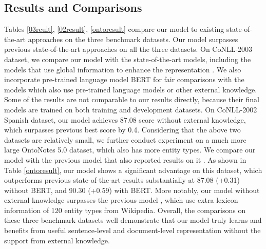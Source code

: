 \documentclass[letterpaper]{article} \usepackage{aaai20}  \usepackage{times}  \usepackage{helvet} \usepackage{courier}  \usepackage[hyphens]{url}  \usepackage{graphicx} \urlstyle{rm} \def\UrlFont{\rm}  \usepackage{graphicx}  \frenchspacing  \setlength{\pdfpagewidth}{8.5in}  \setlength{\pdfpageheight}{11in}
\begin{document}
\subsection{Results and Comparisons} 
Tables \ref{03reult}, \ref{02result}, \ref{ontoresult} compare our model to existing state-of-the-art approaches on the three benchmark datasets. Our model surpasses previous state-of-the-art approaches on all the three datasets.
On CoNLL-2003 dataset, we compare our model with the state-of-the-art models, including the  models that use global information to enhance the representation \cite{yang2017neural,zhang2018sentence,qian2019graphie,liu2019gcdt}. 
We also incorporate pre-trained language model BERT \cite{devlin2018bert} for fair comparisons with the models which also use pre-trained language models or other external knowledge.
Some of the results \cite{akbik2018contextual,akbik2018contextual} are not comparable to our results directly, because their final models are trained on both training and development datasets.
On CoNLL-2002 Spanish dataset, our model achieves 87.08  score without external knowledge, which surpasses previous best score by 0.4.
Considering that the above two datasets are relatively small, we further conduct experiment on a much more large OntoNotes 5.0 dataset, which also has more entity types. 
We compare our model with the previous model that also reported results on it \cite{chiu2016named,shen2017deep,ghaddar2018robust}.
 As shown in Table \ref{ontoresult}, our model shows a significant advantage on this dataset, which outperforms previous state-of-the-art results substantially at 87.08 (+0.31) without BERT,  and 90.30 (+0.59) with BERT. More notably, our model without external knowledge surpasses the previous model \cite{ghaddar2018robust}, which use extra lexicon information of 120 entity types from Wikipedia.
 Overall, the comparisons on these three benchmark datasets well demonstrate that our model truly learns and benefits from useful sentence-level and document-level representation without the support from external knowledge.
 
 \begin{table}[t!] 
\centering
{}
\caption{Ablation study on the three benchmark datasets.}
\label{ablation}
\end{table}  
\end{document}
